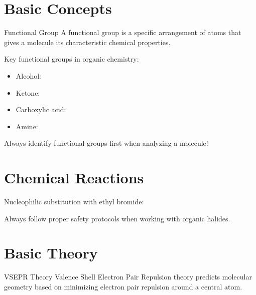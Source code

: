 \documentclass[12pt, a4paper]{article}
\begin{document}
\notestitlepage
\tableofcontents
\newpage

\section{Basic Concepts}

\begin{definition}{Functional Group}
A functional group is a specific arrangement of atoms that gives a molecule its characteristic chemical properties.
\end{definition}

\begin{example}
Key functional groups in organic chemistry:
\begin{itemize}
\item Alcohol: \hydroxylgroup
\item Ketone: \carbonylgroup  
\item Carboxylic acid: \carboxylgroup
\item Amine: \aminogroup
\end{itemize}
\end{example}

\caution[0.5cm] Always identify functional groups first when analyzing a molecule!

\section{Chemical Reactions}

\begin{chemreaction}[Substitution]
Nucleophilic substitution with ethyl bromide:
\begin{center}
\end{center}
\end{chemreaction}

\begin{warning}
Always follow proper safety protocols when working with organic halides.
\end{warning}

\section{Basic Theory}

\begin{theorem}{VSEPR Theory}
Valence Shell Electron Pair Repulsion theory predicts molecular geometry based on minimizing electron pair repulsion around a central atom.
\end{theorem}
\end{document}
